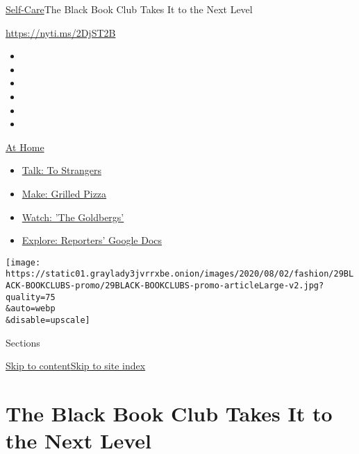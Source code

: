 \href{/section/style/self-care/}{Self-Care}\textbar{}The Black Book Club
Takes It to the Next Level

\url{https://nyti.ms/2DjST2B}

\begin{itemize}
\item
\item
\item
\item
\item
\item
\end{itemize}

\href{https://www.nytimes3xbfgragh.onion/spotlight/at-home?action=click\&pgtype=Article\&state=default\&region=TOP_BANNER\&context=at_home_menu}{At
Home}

\begin{itemize}
\tightlist
\item
  \href{https://www.nytimes3xbfgragh.onion/2020/08/03/well/family/the-benefits-of-talking-to-strangers.html?action=click\&pgtype=Article\&state=default\&region=TOP_BANNER\&context=at_home_menu}{Talk:
  To Strangers}
\item
  \href{https://www.nytimes3xbfgragh.onion/2020/08/01/at-home/coronavirus-make-pizza-on-a-grill.html?action=click\&pgtype=Article\&state=default\&region=TOP_BANNER\&context=at_home_menu}{Make:
  Grilled Pizza}
\item
  \href{https://www.nytimes3xbfgragh.onion/2020/07/31/arts/television/goldbergs-abc-stream.html?action=click\&pgtype=Article\&state=default\&region=TOP_BANNER\&context=at_home_menu}{Watch:
  'The Goldbergs'}
\item
  \href{https://www.nytimes3xbfgragh.onion/interactive/2020/at-home/even-more-reporters-editors-diaries-lists-recommendations.html?action=click\&pgtype=Article\&state=default\&region=TOP_BANNER\&context=at_home_menu}{Explore:
  Reporters' Google Docs}
\end{itemize}

\texttt{[image: https://static01.graylady3jvrrxbe.onion/images/2020/08/02/fashion/29BLACK-BOOKCLUBS-promo/29BLACK-BOOKCLUBS-promo-articleLarge-v2.jpg?quality=75\\\&auto=webp\\\&disable=upscale]}

Sections

\protect\hyperlink{site-content}{Skip to
content}\protect\hyperlink{site-index}{Skip to site index}

\hypertarget{the-black-book-club-takes-it-to-the-next-level}{%
\section{The Black Book Club Takes It to the Next
Level}\label{the-black-book-club-takes-it-to-the-next-level}}

